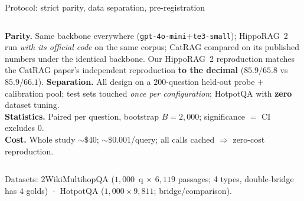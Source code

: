 \documentclass[aspectratio=169,10pt]{beamer}
\newcommand{\hippo}{HippoRAG~2}
\begin{document}
\begin{frame}{Protocol: strict parity, data separation, pre-registration}
\begin{columns}[T]
\footnotesize
\textbf{Parity.} Same backbone everywhere
(\texttt{gpt-4o-mini}$+$\texttt{te3-small}); \hippo{} run \emph{with its
official code} on the same corpus; CatRAG compared on its published numbers
under the identical backbone. Our \hippo{} reproduction matches the CatRAG
paper's independent reproduction \textbf{to the decimal} ($85.9/65.8$ vs
$85.9/66.1$).
\footnotesize
\textbf{Separation.} All design on a $200$-question held-out probe $+$
calibration pool; test sets touched \emph{once per configuration};
HotpotQA with \textbf{zero} dataset tuning.\\[1mm]
\textbf{Statistics.} Paired per question, bootstrap $B{=}2{,}000$;
significance $=$ CI excludes $0$.\\[1mm]
\textbf{Cost.} Whole study ${\sim}\$40$; ${\sim}\$0.001$/query; all calls
cached $\Rightarrow$ zero-cost reproduction.
\end{columns}
\vspace{2mm}
\centering\scriptsize
Datasets: 2WikiMultihopQA ($1{,}000$~q $\times$ $6{,}119$ passages; 4 types,
double-bridge has 4 golds) · HotpotQA ($1{,}000\times9{,}811$; bridge/comparison).
\end{frame}
\end{document}

